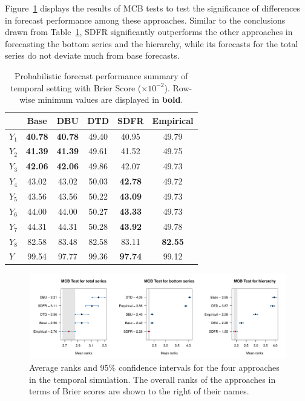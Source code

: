 \documentclass[a4paper,review,12pt,authoryear]{elsarticle}
\theoremstyle{definition}
\begin{document}
     Figure~\ref{fig:sim_temporal_mcb_prob} displays the results of MCB tests to test the significance of differences in forecast performance among these approaches. Similar to the conclusions drawn from Table~\ref{tab:sim_temporal_res_dist}, SDFR significantly outperforms the other approaches in forecasting the bottom series and the hierarchy, while its forecasts for the total series do not deviate much from base forecasts.

     \begin{table}
     \centering
     \caption{\label{tab:sim_temporal_res_dist} Probabilistic forecast performance summary of temporal setting with Brier Score ($\times 10^{-2}$). Row-wise minimum values are displayed in \textbf{bold}.}
     \begin{tabular}{lccccc}
     \toprule
      & Base & DBU & DTD & SDFR & Empirical \\\midrule
      $Y_1$ & \textbf{40.78} & \textbf{40.78} & 49.40 & 40.95 & 49.79 \\ 
      $Y_2$ & \textbf{41.39} & \textbf{41.39} & 49.61 & 41.52 & 49.75 \\ 
      $Y_3$ & \textbf{42.06} & \textbf{42.06} & 49.86 & 42.07 & 49.73 \\ 
      $Y_4$ & 43.02 & 43.02 & 50.03 & \textbf{42.78} & 49.72 \\ 
      $Y_5$ & 43.56 & 43.56 & 50.22 & \textbf{43.09} & 49.73 \\ 
      $Y_6$ & 44.00 & 44.00 & 50.27 & \textbf{43.33} & 49.73 \\ 
      $Y_7$ & 44.31 & 44.31 & 50.28 & \textbf{43.92} & 49.78 \\ 
      $Y_8$ & 82.58 & 83.48 & 82.58 & 83.11 & \textbf{82.55} \\ 
      $Y$ & 99.54 & 97.77 & 99.36 & \textbf{97.74} & 99.12 \\ 
     \bottomrule
     \end{tabular}
     \end{table}


     \begin{figure}
       \caption{\label{fig:sim_temporal_mcb_prob}Average ranks and 95\% confidence intervals for the four approaches in the temporal simulation. The overall ranks of the approaches in terms of Brier scores are shown to the right of their names.}
       \includegraphics[width=\textwidth]{figures/temporal_mcb.pdf}
     \end{figure}
\end{document}

